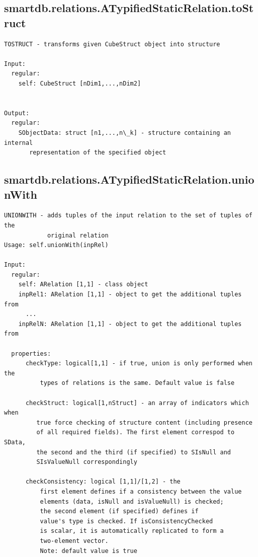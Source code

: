\documentclass[letterpaper,10pt,english]{sphinxmanual}
\begin{document}
\subsection{smartdb.relations.ATypifiedStaticRelation.toStruct}
\label{chap_functions:smartdb-relations-atypifiedstaticrelation-tostruct}
\begin{Verbatim}[commandchars=\\\{\}]
TOSTRUCT - transforms given CubeStruct object into structure

Input:
  regular:
    self: CubeStruct [nDim1,...,nDim2]


Output:
  regular:
    SObjectData: struct [n1,...,n\_k] - structure containing an internal
       representation of the specified object
\end{Verbatim}


\subsection{smartdb.relations.ATypifiedStaticRelation.unionWith}
\label{chap_functions:smartdb-relations-atypifiedstaticrelation-unionwith}
\begin{Verbatim}[commandchars=\\\{\}]
UNIONWITH - adds tuples of the input relation to the set of tuples of the
            original relation
Usage: self.unionWith(inpRel)

Input:
  regular:
    self: ARelation [1,1] - class object
    inpRel1: ARelation [1,1] - object to get the additional tuples from
      ...
    inpRelN: ARelation [1,1] - object to get the additional tuples from

  properties:
      checkType: logical[1,1] - if true, union is only performed when the
          types of relations is the same. Default value is false

      checkStruct: logical[1,nStruct] - an array of indicators which when
         true force checking of structure content (including presence
         of all required fields). The first element correspod to SData,
         the second and the third (if specified) to SIsNull and
         SIsValueNull correspondingly

      checkConsistency: logical [1,1]/[1,2] - the
          first element defines if a consistency between the value
          elements (data, isNull and isValueNull) is checked;
          the second element (if specified) defines if
          value's type is checked. If isConsistencyChecked
          is scalar, it is automatically replicated to form a
          two-element vector.
          Note: default value is true
\end{Verbatim}
\end{document}
